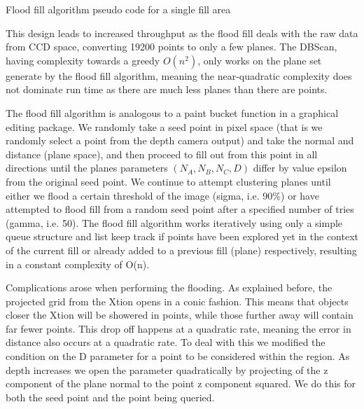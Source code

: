\documentclass[]{article}
\begin{document}
{\begin{algorithm}[tbp]
{{{{				

			}
		}


		}
	}
	\bigskip
	\caption{Flood fill algorithm pseudo code for a single fill area}
	\label{alg:Flood fill algorithm pseudocode for a single fill area}
\end{algorithm}

This design leads to increased throughput as the flood fill deals with the raw data from CCD space, converting 19200 points to only a few planes. The DBScan, having complexity towards a greedy $O(n^{2})$, only works on the plane set generate by the flood fill algorithm, meaning the near-quadratic complexity does not dominate run time as there are much less planes than there are points. 

The flood fill algorithm is analogous to a paint bucket function in a graphical editing package. We randomly take a seed point in pixel space (that is we randomly select a point from the depth camera output) and take the normal and distance (plane space), and then proceed to fill out from this point in all directions until the planes parameters $(N_A, N_B, N_C, D)$ differ by value epsilon from the original seed point. We continue to attempt clustering planes until either we flood a certain threshold of the image (sigma, i.e. 90\%) or have attempted to flood fill from a random seed point after a specified number of tries (gamma, i.e. 50). The flood fill algorithm works iteratively using only a simple queue structure and list keep track if points have been explored yet in the context of the current fill or already added to a previous fill (plane) respectively, resulting in a constant complexity of O(n). 

Complications arose when performing the flooding. As explained before, the projected grid from the Xtion opens in a conic fashion. This means that objects closer the Xtion will be showered in points, while those further away will contain far fewer points. This drop off happens at a quadratic rate, meaning the error in distance also occurs at a quadratic rate. To deal with this we modified the condition on the D parameter for a point to be considered within the region. As depth increases we open the parameter quadratically by projecting of the z component of the plane normal to the point z component squared. We do this for both the seed point and the point being queried. 

}
\end{document}
